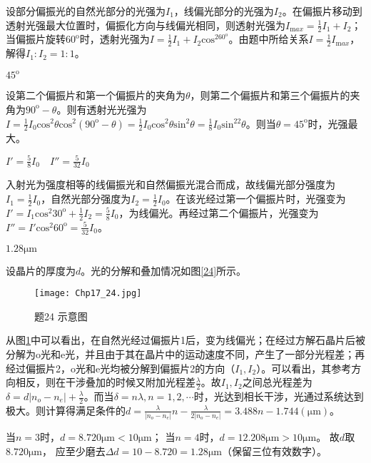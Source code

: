 \solve 设部分偏振光的自然光部分的光强为$I_1$，线偏光部分的光强为$I_2$。在偏振片移动到透射光强最大位置时，偏振化方向与线偏光相同，则透射光强为$I_{\mathrm max}=\frac{1}{2}I_1+I_2$；当偏振片旋转$60^{\mathrm{o}}$时，透射光强为$I=\frac{1}{2}I_1+I_2\mathrm{cos}^260^{\mathrm{o}}$。由题中所给关系$I=\frac{1}{2}I_{\mathrm max}$，解得$I_1:I_2=1:1$。

\exercise $45^{\mathrm{o}}$

\solve 设第二个偏振片和第一个偏振片的夹角为$\theta$，则第二个偏振片和第三个偏振片的夹角为$90^{\mathrm{o}}-\theta$。则有透射光光强为$I=\frac{1}{2}I_0\mathrm{cos}^2\theta\mathrm{cos}^2(90^{\mathrm{o}}-\theta)=\frac{1}{2}I_0\mathrm{cos}^2\theta\mathrm{sin}^2\theta=\frac{1}{8}I_0\mathrm{sin}^22\theta$。则当$\theta=45^{\mathrm{o}}$时，光强最大。

\exercise $I'=\frac{5}{8}I_0$$\quad$$I''=\frac{5}{32}I_0$

\solve 入射光为强度相等的线偏振光和自然偏振光混合而成，故线偏光部分强度为$I_1=\frac{1}{2}I_0$，自然光部分强度为$I_2=\frac{1}{2}I_0$。在该光经过第一个偏振片时，光强变为$I'=I_1\mathrm{cos}^2 30^{\mathrm{o}}+\frac{1}{2}I_2=\frac{5}{8}I_0$，为线偏光。再经过第二个偏振片，光强变为$I''=I'\mathrm{cos}^2 60^{\mathrm{o}}=\frac{5}{32}I_0$。

\exercise $1.28\mathrm{\mu m}$

\solve 设晶片的厚度为$d$。光的分解和叠加情况如图\ref{24}所示。

\begin{figure}[htbp]
	\centering
	\texttt{[image: Chp17\_24.jpg]}
	\caption{题24 示意图}
	\label{fig:17_24}
\end{figure}

从图\ref{fig:17_24}中可以看出，在自然光经过偏振片1后，变为线偏光；在经过方解石晶片后被分解为o光和e光，并且由于其在晶片中的运动速度不同，产生了一部分光程差；再经过偏振片2，o光和e光均被分解到偏振片2的方向（$I_1,I_2$）。可以看出，其参考方向相反，则在干涉叠加的时候又附加光程差$\frac{\lambda}{2}$。故$I_1,I_2$之间总光程差为$\delta=d|n_o-n_e|+\frac{\lambda}{2}$。而当$\delta=n\lambda,n=1,2,\cdots$时，光达到相长干涉，光通过系统达到极大。则计算得满足条件的$d=\frac{\lambda}{|n_o-n_e|}n-\frac{\lambda}{2|n_o-n_e|}=3.488n-1.744(\mathrm{\mu m})$。

当$n=3$时，$d=8.720 \mathrm{\mu m}<10 \mathrm{\mu m}$；
当$n=4$时，$d=12.208 \mathrm{\mu m}>10 \mathrm{\mu m}$。
故$d$取$8.720 \mathrm{\mu m}$，
应至少磨去$\Delta d=10-8.720=1.28 \mathrm{\mu m}$（保留三位有效数字）。
